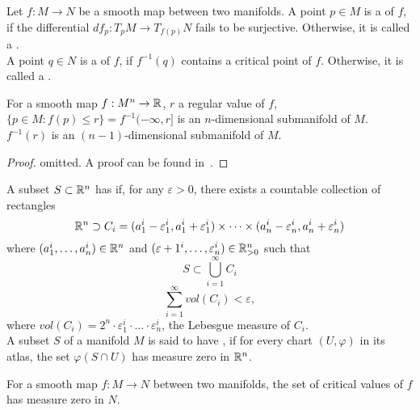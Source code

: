 \documentclass[a4paper,11pt]{article}
\begin{document}
\begin{definition}
    Let \(f:M\to N\) be a smooth map between two manifolds. A point \(p\in M\) is a  of \(f\), if the differential \(df_p:T_p M\to T_{f(p)}N\) fails to be surjective. Otherwise, it is called a .\\
    A point \(q\in N\) is a  of \(f\), if \(f^{-1}(q)\) contains a critical point of \(f\). Otherwise, it is called a .
\end{definition}

\begin{proposition}
    For a smooth map \(f:M^n\to \mathbb{R}\), \(r\) a regular value of \(f\), \(\{p\in M:f(p)\leq r\}=f^{-1}(-\infty,r]\) is an \(n\)-dimensional submanifold of \(M\).\ \(f^{-1}(r)\) is an \((n-1)\)-dimensional submanifold of \(M\).%
\end{proposition}

\begin{proof}
    omitted. A proof can be found in\ \cite{lee}.
\end{proof}


\begin{definition}
    A subset \(S\subset\mathbb{R}^n\) has  if, for any \(\varepsilon>0\), there exists a countable collection of rectangles
    \[\mathbb{R}^n\supset C_i=(a_1^i-\varepsilon_1^i,a_1^i+\varepsilon_1^i)\times\cdots\times(a_n^i-\varepsilon_n^i,a_n^i+\varepsilon_n^i)\]
    where \((a_1^i,\dots,a_n^i)\in\mathbb{R}^n\) and \((\varepsilon+1^i,\dots,\varepsilon_n^i)\in\mathbb{R}^n_{>0}\) such that
    \[S\subset\bigcup_{i=1}^\infty C_i\]
    \[\sum_{i=1}^\infty vol(C_i)<\varepsilon,\]
    where \(vol(C_i)=2^n\cdot\varepsilon_1^i\cdot\ldots\cdot\varepsilon_n^i\), the Lebesgue measure of \(C_i\).\\
    A subset \(S\) of a manifold \(M\) is said to have , if for every chart \((U,\varphi)\) in its atlas, the set \(\varphi(S\cap U)\) has measure zero in \(\mathbb{R}^n\).
\end{definition}

\begin{theorem}\label{sard}
    For a smooth map \(f:M\to N\) between two manifolds, the set of critical values of \(f\) has measure zero in \(N\).
\end{theorem}
\end{document}
